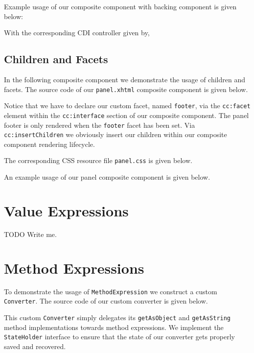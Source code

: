 Example usage of our composite component with backing component is given below:

With the corresponding CDI controller given by,


\subsection{Children and Facets}
In the following composite component we demonstrate the usage of children and facets.
The source code of our \texttt{panel.xhtml} composite component is given below.

Notice that we have to declare our custom facet, named \texttt{footer},
via the \texttt{cc:facet} element within the \texttt{cc:interface} section of our composite component.
The panel footer is only rendered when the \texttt{footer} facet has been set.
Via \texttt{cc:insertChildren} we obviously insert our children within our composite component rendering lifecycle.

The corresponding CSS resource file \texttt{panel.css} is given below.


An example usage of our panel composite component is given below.


\section{Value Expressions}
\begin{TODO}{TODO}
	Write me.
\end{TODO}

\section{Method Expressions}
To demonstrate the usage of \texttt{MethodExpression} we construct a custom \texttt{Converter}.
The source code of our custom converter is given below.

This custom \texttt{Converter} simply delegates its \texttt{getAsObject} and \texttt{getAsString} method implementations towards method expressions.
We implement the \texttt{StateHolder} interface to ensure that the state of our converter gets properly saved and recovered.

